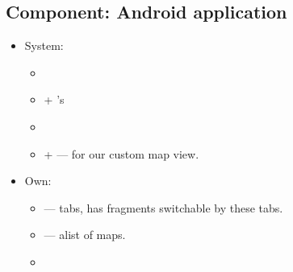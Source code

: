 %
%
%
%
%

\subsection{Component: Android application}
\label{subsec:component-android}


\begin{itemize}
	\item System:
	\begin{itemize}
		\item {}
		\item {} + 's
		\item {}
		\item {} +  --- for our custom map view.
	\end{itemize}

	\item Own:
	\begin{itemize}
		\item {} --- tabs, has fragments switchable by these tabs.
		\item {} --- alist of maps.
		\item {}
	\end{itemize}
\end{itemize}